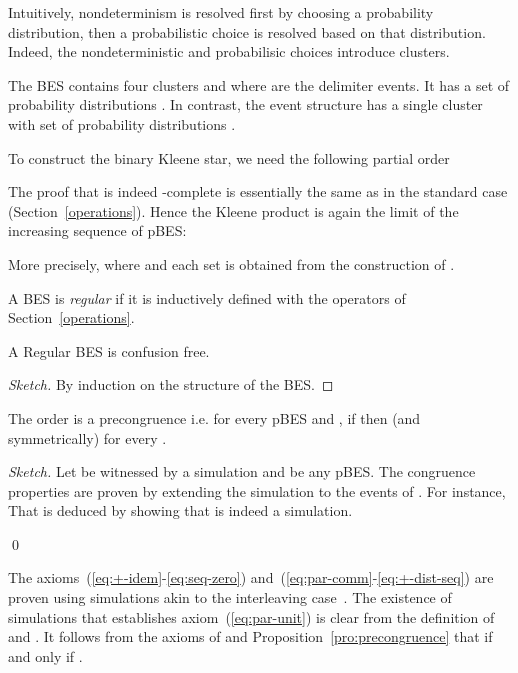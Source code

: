 \documentclass{llncs}
\newcommand{\<}{\langle}
\renewcommand{\>}{\rangle}
\begin{document}
Intuitively, nondeterminism is resolved first by choosing a probability distribution, then a probabilistic choice is resolved based on that distribution. Indeed, the nondeterministic and probabilisic choices introduce clusters.  
\begin{example}
The BES  contains four clusters  and  where  are the delimiter events. It has a set of probability distributions . In contrast, the event structure  has a single cluster  with set of probability distributions .
\end{example}

To construct the binary Kleene star, we need the following partial order 

The proof that  is indeed -complete is essentially the same as in the standard case (Section~\ref{operations}). Hence the Kleene product  is again the limit of the increasing sequence of pBES:

More precisely,  where  and each set  is obtained from the construction of .

A BES is \textit{regular} if it is inductively defined with the operators of Section~\ref{operations}. 

\begin{proposition}\label{pro:confusion-free-regular}
A Regular BES is confusion free.
\end{proposition}

\begin{proof}[Sketch]
By induction on the structure of the BES.
\end{proof}

\begin{proposition}\label{pro:precongruence}
The order  is a precongruence i.e. for every pBES  and , if  then  (and symmetrically) for every . 
\end{proposition}

\begin{proof}[Sketch]
Let  be witnessed by a simulation  and  be any pBES. The congruence properties are proven by extending the simulation  to the events of . For instance, That  is deduced by showing that  is indeed a simulation. 

\qed
\end{proof}


The axioms~(\ref{eq:+-idem}-\ref{eq:seq-zero}) and~(\ref{eq:par-comm}-\ref{eq:+-dist-seq}) are proven using simulations akin to the interleaving case~\cite{Rab13,Den07a}. The existence of simulations that establishes axiom~(\ref{eq:par-unit})  is clear from the definition of  and . It follows from the axioms of  and Proposition~\ref{pro:precongruence} that  if and only if .
\end{document}

